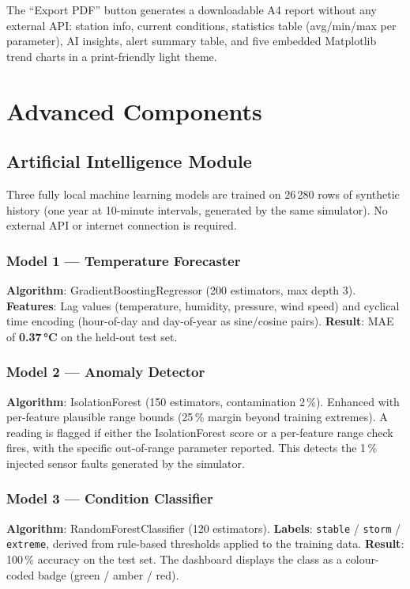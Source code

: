 \documentclass[conference,a4paper]{IEEEtran}
\begin{document}
The ``Export PDF'' button generates a downloadable A4 report without any external API:
station info, current conditions, statistics table (avg/min/max per parameter),
AI insights, alert summary table, and five embedded Matplotlib trend charts in a print-friendly light theme.

\section{Advanced Components}

\subsection{Artificial Intelligence Module}
\label{sec:ai}

Three fully local machine learning models are trained on 26\,280 rows of synthetic
history (one year at 10-minute intervals, generated by the same simulator). No
external API or internet connection is required.

\subsubsection{Model 1 --- Temperature Forecaster}
\textbf{Algorithm}: GradientBoostingRegressor (200 estimators, max depth 3).
\textbf{Features}: Lag values (temperature, humidity, pressure, wind speed) and
cyclical time encoding (hour-of-day and day-of-year as sine/cosine pairs).
\textbf{Result}: MAE of \textbf{0.37\,°C} on the held-out test set.

\subsubsection{Model 2 --- Anomaly Detector}
\textbf{Algorithm}: IsolationForest (150 estimators, contamination 2\,\%).
Enhanced with per-feature plausible range bounds (25\,\% margin beyond training extremes).
A reading is flagged if either the IsolationForest score or a per-feature range check fires,
with the specific out-of-range parameter reported.
This detects the 1\,\% injected sensor faults generated by the simulator.

\subsubsection{Model 3 --- Condition Classifier}
\textbf{Algorithm}: RandomForestClassifier (120 estimators).
\textbf{Labels}: \texttt{stable} / \texttt{storm} / \texttt{extreme},
derived from rule-based thresholds applied to the training data.
\textbf{Result}: 100\,\% accuracy on the test set.
The dashboard displays the class as a colour-coded badge (green / amber / red).
\end{document}
